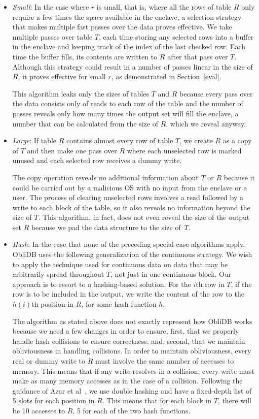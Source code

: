 \documentclass[letterpaper,twocolumn,10pt]{article}
\def\name/{ObliDB}
\begin{document}
\begin{itemize}[itemsep=0pt,parsep=0pt]
\item \textit{Small}: In the case where $r$ is small, that is, where all the rows of table $R$ only require a few times the space available in the enclave, a selection strategy that makes multiple fast passes over the data proves effective. We take multiple passes over table $T$, each time storing any selected rows into a buffer in the enclave and keeping track of the index of the last checked row. Each time the buffer fills, its contents  are written to $R$ after that pass over $T$. Although this strategy could result in a number of passes linear in the size of $R$, it proves effective for small $r$, as demonstrated in Section~\ref{eval}.

This algorithm leaks only the sizes of tables $T$ and $R$ because every pass over the data consists only of reads to each row of the table and the number of passes reveals only how many times the output set will fill the enclave, a number that can be calculated from the size of $R$, which we reveal anyway. 

\item \textit{Large}: If table $R$ contains almost every row of table $T$, we create $R$ as a copy of $T$ and then make one pass over $R$ where each unselected row is marked unused and each selected row receives a dummy write. 

The copy operation reveals no additional information about $T$ or $R$ because it could be carried out by a malicious OS with no input from the enclave or a user. The process of clearing unselected rows involves a read followed by a write to each block of the table, so it also reveals no information beyond the size of $T$. This algorithm, in fact, does not even reveal the size of the output set $R$ because we pad the data structure to the size of~$T$.  

\item \textit{Hash}: In the case that none of the preceding special-case algorithms apply, \name/ uses the following generalization of the continuous strategy. We wish to apply the technique used for continuous data on data that may be arbitrarily spread throughout $T$, not just in one continuous block. Our approach is to resort to a hashing-based solution. For the $i$th row in $T$, if the row is to be included in the output, we write the content of the row to the $h(i)$th position in $R$, for some hash function $h$.

The algorithm as stated above does not exactly represent how \name/ works because we need a few changes in order to ensure, first, that we properly handle hash collisions to ensure correctness, and, second, that we maintain obliviousness in handling collisions. In order to maintain obliviousness, every real or dummy write to $R$ must involve the same number of accesses to memory. This means that if any write resolves in a collision, every write must make as many memory accesses as in the case of a collision. Following the guidance of Azar et al~\cite{ABKU99}, we use double hashing and have a fixed-depth list of 5 slots for each position in $R$. This means that for each block in $T$, there will be 10 accesses to $R$, 5 for each of the two hash functions. 


\end{itemize}
\end{document}
